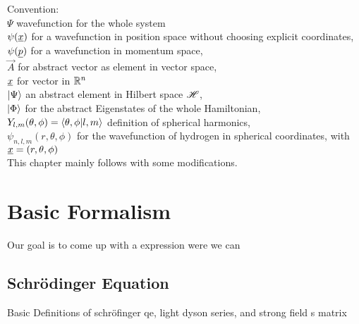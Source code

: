 Convention: \\
$\Psi$ wavefunction for the whole system  \\
$\psi(\underline{x})$ for a wavefunction in position space without choosing explicit coordinates, \\
$\psi(\underline{p})$  for a wavefunction in momentum space, \\
$\vec{A}$ for abstract vector as element in vector space, \\
$\underline{x}$ for vector in $\mathbb{R}^n$ \\
$\ket{\Psi}$ an abstract element in Hilbert space $\mathscr{H}$, \\
$\ket{\Phi}$ for the abstract Eigenstates of the whole Hamiltonian, \\
$Y_{l, m}(\theta, \phi) = \braket{\theta, \phi | l, m}$ definition of spherical harmonics, \\
$\psi_{n, l, m}(r, \theta, \phi)$ for the wavefunction of hydrogen in spherical coordinates, with $\underline{x}=(r, \theta, \phi)$ \\


This chapter mainly follows \cite{Ivanov20012005} with some modifications.



\section{Basic Formalism}
Our goal is to come up with a expression were we can 


\subsection{Schrödinger Equation}

Basic Definitions of schröfinger qe, light dyson series, and strong field s matrix

